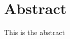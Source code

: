 \documentclass[../main.tex]{subfiles}
\begin{document}
\section{Abstract}

    This is the abstract
\end{document}

